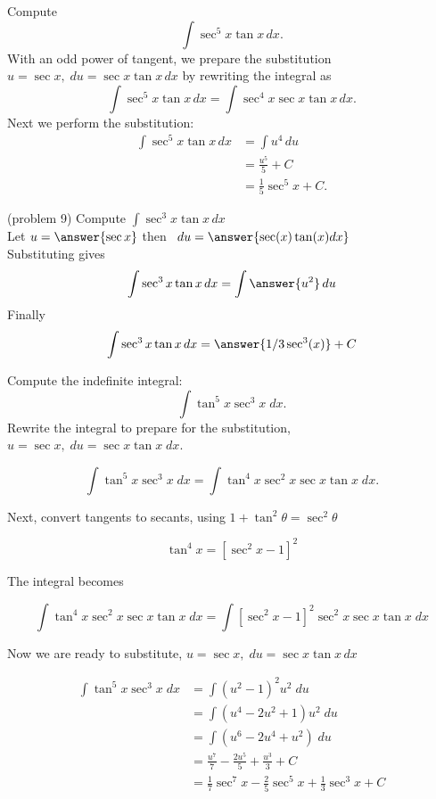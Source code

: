 \documentclass[handout]{ximera}
\begin{document}
\begin{example}[example 9]

Compute
\[
\int \sec^5 x \tan x \, dx.
\]
With an odd power of tangent, we prepare the substitution $u = \sec x, \; du = \sec x\tan x \, dx$ by rewriting the integral as
\[
\int \sec^5 x \tan x \, dx = \int \sec^4 x \sec x \tan x \, dx.
\]
Next we perform the substitution:
\begin{align*}
\int \sec^5 x \tan x \, dx &= \int u^4 \, du\\
                             &= \frac{u^5}{5} + C\\
                             &= \frac15 \sec^5 x + C.
\end{align*}

\end{example}


\begin{problem}(problem 9)
Compute $\displaystyle{\int \sec^3 x \tan x \, dx}$\\
Let $u = \answer{\sec x}$ then \, $du = \answer{\sec(x)\tan(x) dx}$\\
Substituting gives 
\[
\int \sec^3 x \tan x \, dx = \int \answer{u^2} \, du
\]
Finally
\[
\int \sec^3 x \tan x \, dx = \answer{1/3 \sec^3(x)} + C
\]

\end{problem}


\begin{example}[example 10]
Compute the indefinite integral:
\[
\int \tan^5 x \sec^3 x\;dx.
\]
Rewrite the integral to prepare for the substitution, $u = \sec x, \;du = \sec x \tan x \; dx$.

\[
\int \tan^5 x \sec^3 x\;dx = \int \tan^4 x \sec^2 x \sec x \tan x\;dx.
\]

Next, convert tangents to secants, using $1+ \tan^2 \theta = \sec^2 \theta$

\[
\tan^4 x = \left[\sec^2 x - 1\right]^2
\]

The integral becomes

\[
 \int \tan^4 x \sec^2 x \sec x \tan x\;dx = \int \left[\sec^2 x -1\right]^2 \sec^2 x \sec x \tan x\;dx
\]

Now we are ready to substitute, $u = \sec x, \; du = \sec x \tan x \, dx$

\begin{align*}
\int \tan^5 x \sec^3 x\;dx &= \int \left(u^2 -1\right)^2 u^2 \; du \\
                             &= \int \left(u^4 - 2u^2 +1\right) u^2 \; du \\
                             &= \int \left(u^6 - 2u^4 +u^2\right) \; du \\
                             &=  \frac{u^7}{7} - \frac{2u^5}{5} + \frac{u^3}{3} + C  \\
                             &= \frac17\sec^7 x - \frac25 \sec^5 x + \frac13 \sec^3 x + C
\end{align*}
\end{example}
\end{document}
